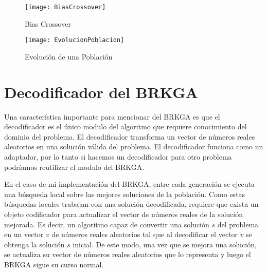 \begin{figure}[h]
	\caption{Bias Crossover}
	\centering
	\texttt{[image: BiasCrossover]}
	\label{fig:biasCrossover}
\end{figure}

\begin{figure}[h]
	\caption{Evolución de una Población}
	\centering
	\texttt{[image: EvolucionPoblacion]}
	\label{fig:evolucion}
\end{figure}

\section{Decodificador del BRKGA}

Una característica importante para mencionar del BRKGA es que el decodificador es el único modulo del algoritmo que requiere conocimiento del dominio del problema. El decodificador transforma un vector de números reales aleatorios en una solución válida del problema. El decodificador funciona como un adaptador, por lo tanto si hacemos un decodificador para otro problema podríamos reutilizar el modulo del BRKGA.

\bigskip

En el caso de mi implementación del BRKGA, entre cada generación se ejecuta una búsqueda local sobre las mejores soluciones de la población. Como estas búsquedas locales trabajan con una solución decodificada, requiere que exista un objeto codificador para actualizar el vector de números reales de la solución mejorada. Es decir, un algoritmo capaz de convertir una solución $s$ del problema en un vector $v$ de números reales aleatorios tal que al decodificar el vector $v$ se obtenga la solución $s$ inicial. De este modo, una vez que se mejora una solución, se actualiza su vector de números reales aleatorios que lo representa y luego el BRKGA sigue su curso normal. 

